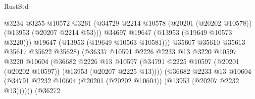 \begin{lexlean}{RustStd}
\begin{coremodule}
                                              @3234
                                              @3255
                                              @10572
                                              @3261
                                              (@34729
                                                @2214
                                                @10578
                                                (@20201 (@20202 @10578))
                                                (@13953 (@20207 @2214 @53)))
                                              @34697
                                              @19647
                                              (@13953 (@19649 @10573 @3220)))
                                            @19647
                                            (@13953 (@19649 @10563 @10581)))
                                          @35607
                                          @35610
                                          @35613
                                          @35617
                                          @35622
                                          @35628)
                                        (@36337
                                          @10591
                                          @2226
                                          @2233
                                          @13
                                          @3220
                                          @10597
                                          @3220
                                          @10604
                                          (@36682
                                            @2226
                                            @13
                                            @10597
                                            (@34791
                                              @2225
                                              @10597
                                              (@20201 (@20202 @10597))
                                              (@13953 (@20207 @2225 @13))))
                                          (@36682
                                            @2233
                                            @13
                                            @10604
                                            (@34791
                                              @2232
                                              @10604
                                              (@20201 (@20202 @10604))
                                              (@13953 (@20207 @2232 @13))))))
                                      (@36272

\end{coremodule}
\end{lexlean}

